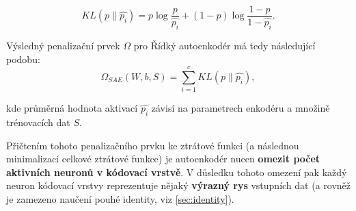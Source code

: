 \begin{equation}
    KL(p \parallel \hat{p_i}) = p \log \frac{p}{\hat{p_i}} + (1 - p) \log \frac{1 - p}{1 - \hat{p_i}}.
\end{equation}

Výsledný penalizační prvek $\Omega$ pro Řídký autoenkodér má tedy následující podobu:
\begin{equation}
    \Omega_{SAE}(W, b, S) = \sum_{i=1}^{c}KL(p \parallel \hat{p_i}),
\end{equation}

kde průměrná hodnota aktivací $\hat{p_i}$ závisí na parametrech enkodéru a množině trénovacích dat $S$. \cite{Charte2018}

Přičtením tohoto penalizačního prvku ke ztrátové funkci (a následnou minimalizací celkové ztrátové funkce) je autoenkodér nucen \textbf{omezit počet aktivních neuronů v kódovací vrstvě}.
V důsledku tohoto omezení pak každý neuron kódovací vrstvy reprezentuje nějaký \textbf{výrazný rys} vstupních dat (a rovněž je zamezeno naučení pouhé identity, viz \autoref{sec:identity}). \cite{Goodfellow2016}
